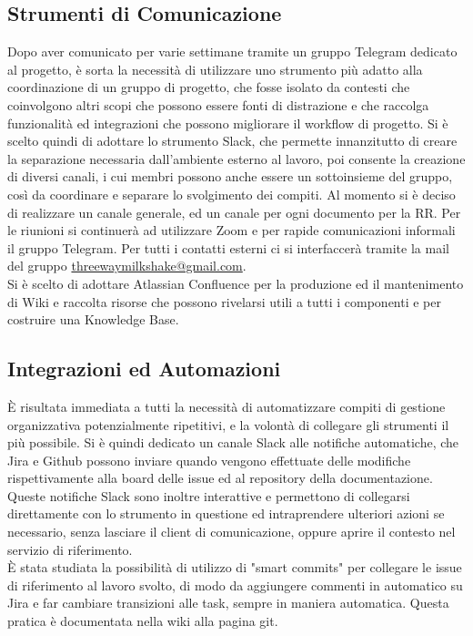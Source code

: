 \subsection{Strumenti di Comunicazione}
Dopo aver comunicato per varie settimane tramite un gruppo Telegram dedicato al progetto, è sorta la necessità di utilizzare uno strumento più adatto alla coordinazione di un gruppo di progetto, che fosse isolato da contesti che coinvolgono altri scopi che possono essere fonti di distrazione e che raccolga funzionalità ed integrazioni che possono migliorare il workflow di progetto. Si è scelto quindi di adottare lo strumento Slack, che permette innanzitutto di creare la separazione necessaria dall'ambiente esterno al lavoro, poi consente la creazione di diversi canali, i cui membri possono anche essere un sottoinsieme del gruppo, così da coordinare e separare lo svolgimento dei compiti. Al momento si è deciso di realizzare un canale generale, ed un canale per ogni documento per la RR. Per le riunioni si continuerà ad utilizzare Zoom e per rapide comunicazioni informali il gruppo Telegram. Per tutti i contatti esterni ci si interfaccerà tramite la mail del gruppo \href{mailto:threewaymilkshake@gmail.com}{threewaymilkshake@gmail.com}.\\
Si è scelto di adottare Atlassian Confluence per la produzione ed il mantenimento di Wiki e raccolta risorse che possono rivelarsi utili a tutti i componenti e per costruire una Knowledge Base.

\subsection{Integrazioni ed Automazioni}
È risultata immediata a tutti la necessità di automatizzare compiti di gestione organizzativa potenzialmente ripetitivi, e la volontà di collegare gli strumenti il più possibile. Si è quindi dedicato un canale Slack alle notifiche automatiche, che Jira e Github possono inviare quando vengono effettuate delle modifiche rispettivamente alla board delle issue ed al repository della documentazione. Queste notifiche Slack sono inoltre interattive e permettono di collegarsi direttamente con lo strumento in questione ed intraprendere ulteriori azioni se necessario, senza lasciare il client di comunicazione, oppure aprire il contesto nel servizio di riferimento.\\
È stata studiata la possibilità di utilizzo di "smart commits" per collegare le issue di riferimento al lavoro svolto, di modo da aggiungere commenti in automatico su Jira e far cambiare transizioni alle task, sempre in maniera automatica. Questa pratica è documentata nella wiki alla pagina git.